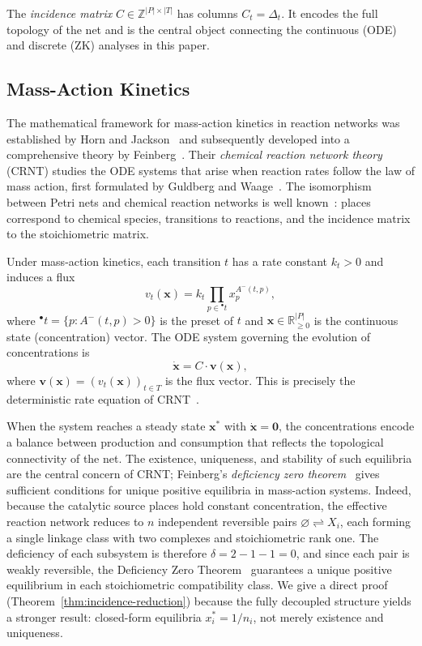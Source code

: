 \documentclass[11pt,a4paper]{article}
\newcommand{\R}{\mathbb{R}}
\newcommand{\Z}{\mathbb{Z}}
\begin{document}
The \emph{incidence matrix} $C \in \Z^{|P| \times |T|}$ has columns $C_t = \Delta_t$.
It encodes the full topology of the net and is the central object connecting the continuous (ODE) and discrete (ZK) analyses in this paper.

\subsection{Mass-Action Kinetics}

The mathematical framework for mass-action kinetics in reaction networks was established by Horn and Jackson~\cite{horn1972} and subsequently developed into a comprehensive theory by Feinberg~\cite{feinberg1979,feinberg2019}.
Their \emph{chemical reaction network theory} (CRNT) studies the ODE systems that arise when reaction rates follow the law of mass action, first formulated by Guldberg and Waage~\cite{guldberg1864}.
The isomorphism between Petri nets and chemical reaction networks is well known~\cite{heiner2008}: places correspond to chemical species, transitions to reactions, and the incidence matrix to the stoichiometric matrix.

Under mass-action kinetics, each transition $t$ has a rate constant $k_t > 0$ and induces a flux
\[
  v_t(\mathbf{x}) = k_t \prod_{p \in {}^{\bullet}t} x_p^{A^-(t,p)},
\]
where ${}^{\bullet}t = \{p : A^-(t,p) > 0\}$ is the preset of $t$ and $\mathbf{x} \in \R_{\geq 0}^{|P|}$ is the continuous state (concentration) vector.
The ODE system governing the evolution of concentrations is
\begin{equation}\label{eq:mass-action}
  \dot{\mathbf{x}} = C \cdot \mathbf{v}(\mathbf{x}),
\end{equation}
where $\mathbf{v}(\mathbf{x}) = (v_t(\mathbf{x}))_{t \in T}$ is the flux vector.
This is precisely the deterministic rate equation of CRNT~\cite{horn1972}.

When the system reaches a steady state $\mathbf{x}^*$ with $\dot{\mathbf{x}} = \mathbf{0}$, the concentrations encode a balance between production and consumption that reflects the topological connectivity of the net.
The existence, uniqueness, and stability of such equilibria are the central concern of CRNT; Feinberg's \emph{deficiency zero theorem}~\cite{feinberg1979} gives sufficient conditions for unique positive equilibria in mass-action systems.
Indeed, because the catalytic source places hold constant concentration, the effective reaction network reduces to $n$ independent reversible pairs $\varnothing \rightleftharpoons X_i$, each forming a single linkage class with two complexes and stoichiometric rank one.
The deficiency of each subsystem is therefore $\delta = 2 - 1 - 1 = 0$, and since each pair is weakly reversible, the Deficiency Zero Theorem~\cite{feinberg1987} guarantees a unique positive equilibrium in each stoichiometric compatibility class.
We give a direct proof (Theorem~\ref{thm:incidence-reduction}) because the fully decoupled structure yields a stronger result: closed-form equilibria $x_i^* = 1/n_i$, not merely existence and uniqueness.
\end{document}
